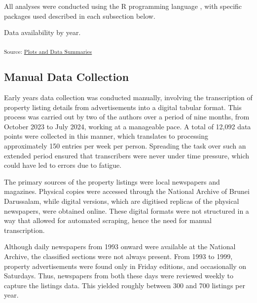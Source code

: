 \documentclass[
  number]{elsarticle}
\begin{document}
All analyses were conducted using the R programming language
\citep{rcoreteam2024language}, with specific packages used described in
each subsection below.

\begin{table}

\caption{\label{tbl-avail}Data availability by year.}

\centering{

}

\end{table}%

\textsubscript{Source:
\href{https://Bruneiverse.github.io/house-data/notebooks/analysis-preview.html\#cell-tbl-avail}{Plots
and Data Summaries}}

\subsection{Manual Data Collection}\label{manual-data-collection}

Early years data collection was conducted manually, involving the
transcription of property listing details from advertisements into a
digital tabular format. This process was carried out by two of the
authors over a period of nine months, from October 2023 to July 2024,
working at a manageable pace. A total of 12,092 data points were
collected in this manner, which translates to processing approximately
150 entries per week per person. Spreading the task over such an
extended period ensured that transcribers were never under time
pressure, which could have led to errors due to fatigue.

The primary sources of the property listings were local newspapers and
magazines. Physical copies were accessed through the National Archive of
Brunei Darussalam, while digital versions, which are digitised replicas
of the physical newspapers, were obtained online. These digital formats
were not structured in a way that allowed for automated scraping, hence
the need for manual transcription.

Although daily newspapers from 1993 onward were available at the
National Archive, the classified sections were not always present. From
1993 to 1999, property advertisements were found only in Friday
editions, and occasionally on Saturdays. Thus, newspapers from both
these days were reviewed weekly to capture the listings data. This
yielded roughly between 300 and 700 listings per year.
\end{document}
